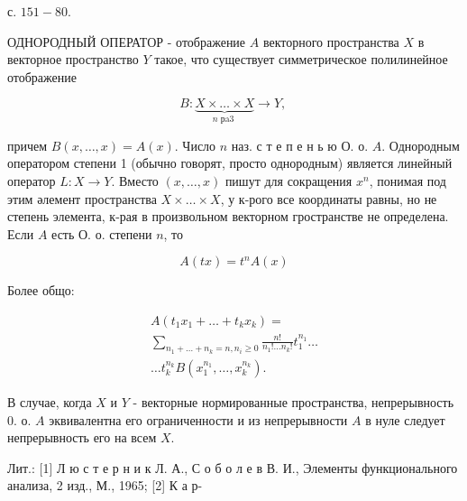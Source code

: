 \documentclass[10pt]{article}
\begin{document}
с. $151-80$.



ОДНОРОДНЫЙ ОПЕРАТОР - отображение $A$ векторного пространства $X$ в векторное пространство $Y$ такое, что существует симметрическое полилинейное отображение



\[

B: \underbrace{X \times \ldots \times X}_{n \text { рa3 }} \rightarrow Y \text {, }

\]



причем $B(x, \ldots, x)=A(x)$. Число $n$ наз. с т е п е н ь ю О. о. $A$. Однородным оператором степени 1 (обычно говорят, просто однородным) является линейный оператор $L: X \rightarrow Y$. Вместо $(x, \ldots, x)$ пишут для сокращения $x^{n}$, понимая под этим әлемент пространства $X \times \ldots \times X$, у к-рого все координаты равны, но не степень элемента, к-рая в произвольном векторном гространстве не определена. Если $A$ есть О. о. степени $n$, то



\[

A(t x)=t^{n} A(x)

\]



Более общо:



\[

\begin{gathered}

A\left(t_{1} x_{1}+\ldots+t_{k} x_{k}\right)= \\

\sum_{n_{1}+\ldots+n_{k}=n, n_{i} \geqslant 0} \frac{n !}{n_{1} ! \ldots n_{k} !} t_{1}^{n_{1}} \ldots \\

\ldots t_{k}^{n_{k}} B\left(x_{1}^{n_{1}}, \ldots, x_{k}^{n_{k}}\right) .

\end{gathered}

\]



В случае, когда $X$ и $Y$ - векторные нормированные пространства, непрерывность 0. о. $A$ эквивалентна его ограниченности и из непрерывности $A$ в нуле следует непрерывность его на всем $X$.



Лит.: [1] Л ю с т е р н и к Л. А., С о б о л е в В. И., Элементы функционального анализа, 2 изд., М., 1965; [2] К а р-
\end{document}
